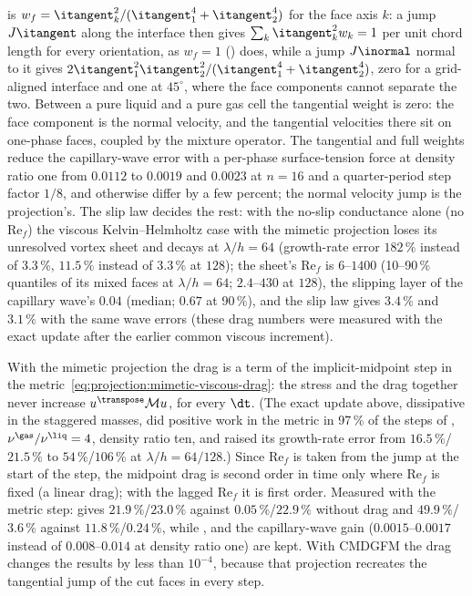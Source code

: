 is $w_f=\itangent_k^2/(\itangent_1^4+\itangent_2^4)$ for the face axis $k$:
a jump $J\itangent$ along the interface then gives
$\sum_k\itangent_k^2w_k=1$ per unit chord length for every orientation, as
$w_f=1$ () does, while a jump $J\inormal$ normal to it
gives $2\itangent_1^2\itangent_2^2/(\itangent_1^4+\itangent_2^4)$, zero for a
grid-aligned interface and one at $45^\circ$, where the face components
cannot separate the two. Between a pure liquid and a pure gas cell the
tangential weight is zero: the face component is the normal velocity, and the
tangential velocities there sit on one-phase faces, coupled by the mixture
operator. The tangential and full weights reduce the capillary-wave error
with a per-phase surface-tension force at density ratio one from $0.0112$ to
$0.0019$ and $0.0023$ at $n=16$ and a quarter-period step factor $1/8$, and
otherwise differ by a few percent; the normal velocity jump is the
projection's. The slip law decides the rest: with the no-slip conductance
alone (no $\mathrm{Re}_f$) the viscous Kelvin--Helmholtz case
 with the mimetic projection loses its unresolved vortex sheet
and decays at $\lambda/h=64$ (growth-rate error $182\,\%$ instead of
$3.3\,\%$, $11.5\,\%$ instead of $3.3\,\%$ at $128$); the sheet's
$\mathrm{Re}_f$ is $6$--$1400$ (10--90\,\% quantiles of its mixed faces at
$\lambda/h=64$; $2.4$--$430$ at $128$), the slipping layer of the capillary
wave's $0.04$ (median; $0.67$ at 90\,\%), and the slip law gives $3.4\,\%$ and
$3.1\,\%$ with the same wave errors (these drag numbers were measured with
the exact update after the earlier common viscous increment).

With the mimetic projection the drag is a term of the implicit-midpoint step
in the metric~\cref{eq:projection:mimetic-viscous-drag}: the stress and the
drag together never increase $u^{\transpose}\mathcal Mu$, for every $\dt$.
(The exact update above, dissipative in the staggered masses, did positive
work in the metric in 97\,\% of the steps of , $\nu^{\gas}/\nu^{\liq}=4$,
density ratio ten, and raised its growth-rate error from $16.5\,\%$/$21.5\,\%$
to $54\,\%$/$106\,\%$ at $\lambda/h=64/128$.) Since $\mathrm{Re}_f$ is taken
from the jump at the start of the step, the midpoint drag is second order in
time only where $\mathrm{Re}_f$ is fixed (a linear drag); with the lagged
$\mathrm{Re}_f$ it is first order. Measured with the metric step:
 gives $21.9\,\%$/$23.0\,\%$ against $0.05\,\%$/$22.9\,\%$
without drag and  $49.9\,\%$/$3.6\,\%$ against
$11.8\,\%$/$0.24\,\%$, while ,  and the
capillary-wave gain ($0.0015$--$0.0017$ instead of $0.008$--$0.014$ at
density ratio one) are kept. With CMDGFM the drag changes the results
by less than $10^{-4}$, because that projection recreates the tangential jump
of the cut faces in every step.

